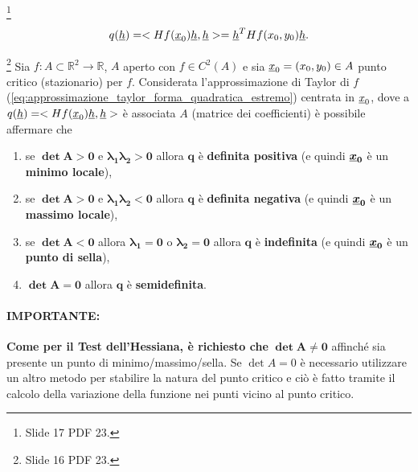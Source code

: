  \begin{remark}\footnote{Slide 17 PDF 23.}
 	\begin{equation*}
 		q(\uline h) = <Hf(\uline x_0)\uline h, \uline h> = \uline h^T Hf(x_0,y_0)\uline h.
 	\end{equation*}
 \end{remark}

\begin{theorem}\label{th:studio_segno_forma_quadratica}\footnote{Slide 16 PDF 23.}
	Sia $f:A\subset \mathbb{R}^2\rightarrow\mathbb{R}$, $A$ aperto con $f\in C^2(A)$ e sia $\uline x_0 = (x_0,y_0)\in A$ punto critico (stazionario) per $f$. Considerata l'approssimazione di Taylor di $f$ (\ref{eq:approssimazione_taylor_forma_quadratica_estremo}) centrata in $\uline x_0$, dove a $q(\uline h)=<Hf(\uline x_0)\uline h, \uline h>$ è associata $A$ (matrice dei coefficienti) è possibile affermare che
	\begin{enumerate}
		\item se $\boldsymbol{\det A>0}$ e $ \boldsymbol{\lambda_1\lambda_2>0}$ allora $\boldsymbol q$ è \textbf{definita positiva} (e quindi $\boldsymbol{\uline x_0}$ è un \textbf{minimo locale}),
		\item se $\boldsymbol{\det A>0}$ e $ \boldsymbol{\lambda_1\lambda_2<0}$ allora $\boldsymbol q$ è \textbf{definita negativa} (e quindi $\boldsymbol{\uline x_0}$ è un \textbf{massimo locale}),
		\item se $\boldsymbol{\det A<0}$ allora $ \boldsymbol{\lambda_1=0}$  o $\boldsymbol{\lambda_2=0}$ allora $\boldsymbol q$ è \textbf{indefinita} (e quindi $\boldsymbol{\uline x_0}$ è un \textbf{punto di sella}),
		\item $\boldsymbol{\det A=0}$ allora $\boldsymbol{q}$ è \textbf{semidefinita}.
	\end{enumerate}
\end{theorem}

\paragraph{IMPORTANTE:} \textbf{Come per il Test dell'Hessiana, è richiesto che} $\boldsymbol{\det A\neq 0}$ affinché sia presente un punto di minimo/massimo/sella. Se $\det A = 0$ è necessario utilizzare un altro metodo per stabilire la natura del punto critico e ciò è fatto tramite il calcolo della variazione della funzione nei punti vicino al punto critico.

